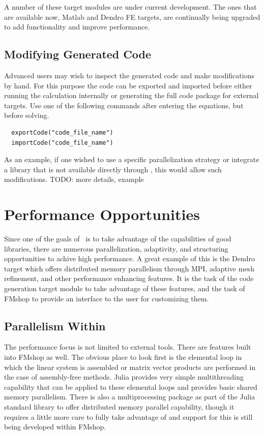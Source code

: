 \documentclass[twoside,leqno,twocolumn]{article}
\begin{document}
A number of these target modules are under current development. The ones that are available now, Matlab and Dendro FE targets, are continually being upgraded to add functionality and improve performance.

\subsection{Modifying Generated Code}
Advanced users may wish to inspect the generated code and make modifications by hand. For this purpose the code can be exported and imported before either running the calculation internally or generating the full code package for external targets. Use one of the following commands after entering the equations, but before solving.
\begin{verbatim}
  exportCode("code_file_name")
  importCode("code_file_name")
\end{verbatim}

As an example, if one wished to use a specific parallelization strategy or integrate a library that is not available directly through \FMshop, this would allow such modifications. TODO: more details, example

\section{Performance Opportunities}
Since one of the goals of \FMshop\ is to take advantage of the capabilities of good libraries, there are numerous parallelization, adaptivity, and structuring opportunities to achive high performance. A great example of this is the Dendro target which offers distributed memory parallelism through MPI, adaptive mesh refinement, and other performance enhancing features. It is the task of the code generation target module to take advantage of these features, and the task of FMshop to provide an interface to the user for customizing them.

\subsection{Parallelism Within \FMshop}
The performance focus is not limited to external tools. There are features built into FMshop as well. The obvious place to look first is the elemental loop in which the linear system is assembled or matrix vector products are performed in the case of assembly-free methods. Julia provides very simple multithreading capability that can be applied to these elemental loops and provides basic shared memory parallelism. There is also a multiprocessing package as part of the Julia standard library to offer distributed memory parallel capability, though it requires a little more care to fully take advantage of and support for this is still being developed within FMshop. 
\end{document}
